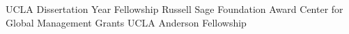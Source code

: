  {UCLA Dissertation Year Fellowship}
 {Russell Sage Foundation Award}
 {Center for Global Management Grants \vspace{0.8cm}} 
 {UCLA Anderson Fellowship\vspace{0.8cm}}



